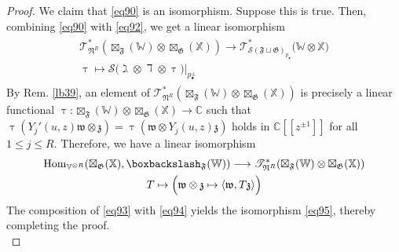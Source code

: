 \documentclass[11pt,b5paper,notitlepage]{article}
\theoremstyle{definition}
\theoremstyle{plain}
\newcommand{\fk}{\mathfrak}
\newcommand{\Hom}{\mathrm{Hom}}
\newcommand{\blt}{\bullet}
\newcommand{\Vbb}{\mathbb V}
\newcommand{\Xbb}{\mathbb X}
\newcommand{\Wbb}{\mathbb W}
\newcommand{\Cbb}{\mathbb C}
\newcommand{\<}{\left\langle}
\renewcommand{\>}{\right\rangle}
\newcommand{\ST}{\mathscr{T}}
\newcommand{\MS}{\mathcal{S}}
\newcommand{\bk}[1]{\langle {#1}\rangle}
\newcommand{\bbs}{\boxbackslash}
\newcommand{\fn}{\mathfrak{N}}
\newcommand{\ff}{\mathfrak{F}}
\newcommand{\fg}{\mathfrak{G}}
\numberwithin{equation}{section}
\begin{document}
\begin{proof}
We claim that \eqref{eq90} is an isomorphism. Suppose this is true. Then, combining \eqref{eq90} with \eqref{eq92}, we get a linear isomorphism
\begin{gather}\label{eq93}
\begin{gathered}
\ST^*_{\fn^R}(\boxtimes_\ff(\Wbb)\otimes\boxtimes_\fg(\Xbb))\longrightarrow\ST^*_{\MS(\ff\sqcup\fg)_{p_\blt}}\big(\Wbb\otimes\Xbb\big)\\
\uptau\mapsto \MS\big(\gimel\otimes\daleth\otimes\uptau\big)\big|_{p^\pm_\blt}
\end{gathered}
\end{gather}
By Rem. \ref{lb39}, an element of $\ST^*_{\fn^R}(\boxtimes_\ff(\Wbb)\otimes\boxtimes_\fg(\Xbb))$ is precisely a linear functional $\uptau:\boxtimes_\ff(\Wbb)\otimes\boxtimes_\fg(\Xbb)\rightarrow\Cbb$ such that $\uptau(Y_j'(u,z)\fk w\otimes\fk z)=\uptau(\fk w\otimes Y_j(u,z)\fk z)$ holds in $\Cbb[[z^{\pm1}]]$ for all $1\leq j\leq R$. Therefore, we have a linear isomorphism
\begin{gather}\label{eq94}
\begin{gathered}
\Hom_{\Vbb^{\otimes R}}(\boxtimes_\fg(\Xbb),\bbs_\ff(\Wbb))\longrightarrow\ST^*_{\fn^R}(\boxtimes_\ff(\Wbb)\otimes\boxtimes_\fg(\Xbb))\\
T\mapsto \Big(\fk w\otimes\fk z\mapsto\bk{\fk w,T\fk z}  \Big)
\end{gathered}
\end{gather}
The composition of \eqref{eq93} with \eqref{eq94} yields the isomorphism \eqref{eq95}, thereby completing the proof.\\[-1ex]




\end{proof}
\end{document}

